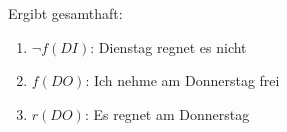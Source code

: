 \documentclass[12pt]{scrartcl}
\begin{document}
Ergibt gesamthaft:
\begin{enumerate}
    \item $\lnot f(DI)$: Dienstag regnet es nicht
    \item $f(DO)$: Ich nehme am Donnerstag frei
    \item $r(DO)$: Es regnet am Donnerstag
\end{enumerate}






% 
\end{document}
